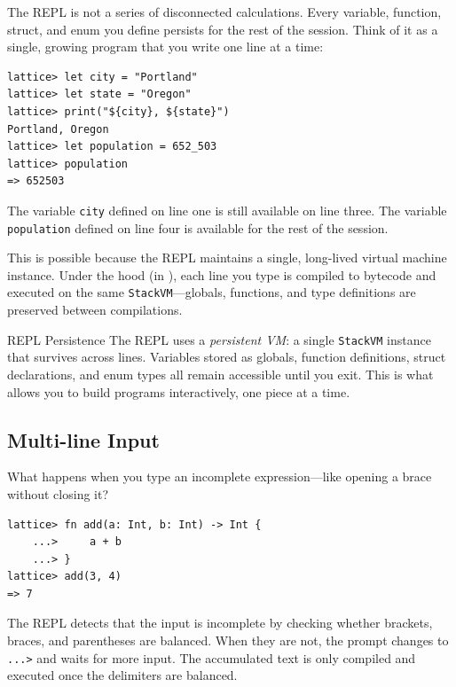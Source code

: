 The REPL is not a series of disconnected calculations.
Every variable, function, struct, and enum you define persists for the rest of the session.
Think of it as a single, growing program that you write one line at a time:

\begin{lstlisting}[language=Lattice, numbers=none]
lattice> let city = "Portland"
lattice> let state = "Oregon"
lattice> print("${city}, ${state}")
Portland, Oregon
lattice> let population = 652_503
lattice> population
=> 652503
\end{lstlisting}

The variable \lstinline|city| defined on line one is still available on line three.
The variable \lstinline|population| defined on line four is available for the rest of the session.

This is possible because the REPL maintains a single, long-lived virtual machine instance.
Under the hood (in ), each line you type is compiled to bytecode and executed on the same \lstinline|StackVM|---globals, functions, and type definitions are preserved between compilations.

\begin{defnbox}{REPL Persistence}
The REPL uses a \emph{persistent VM}: a single \lstinline|StackVM| instance that survives across lines.
Variables stored as globals, function definitions, struct declarations, and enum types all remain accessible until you exit.
This is what allows you to build programs interactively, one piece at a time.
\end{defnbox}

\subsection{Multi-line Input}\label{subsec:multi-line}

What happens when you type an incomplete expression---like opening a brace without closing it?

\begin{lstlisting}[language=Lattice, numbers=none]
lattice> fn add(a: Int, b: Int) -> Int {
    ...>     a + b
    ...> }
lattice> add(3, 4)
=> 7
\end{lstlisting}

The REPL detects that the input is incomplete by checking whether brackets, braces, and parentheses are balanced.
When they are not, the prompt changes to \lstinline|    ...>| and waits for more input.
The accumulated text is only compiled and executed once the delimiters are balanced.

